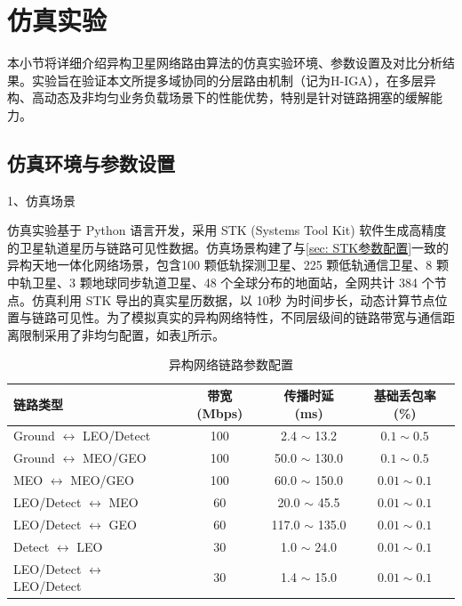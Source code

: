 \section{仿真实验}
    本小节将详细介绍异构卫星网络路由算法的仿真实验环境、参数设置及对比分析结果。实验旨在验证本文所提多域协同的分层路由机制（记为H-IGA），在多层异构、高动态及非均匀业务负载场景下的性能优势，特别是针对链路拥塞的缓解能力。
    \subsection{仿真环境与参数设置}
    1、仿真场景
    
    仿真实验基于 Python 语言开发，采用 STK (Systems Tool Kit) 软件生成高精度的卫星轨道星历与链路可见性数据。仿真场景构建了与\ref{sec: STK参数配置}一致的异构天地一体化网络场景，包含100 颗低轨探测卫星、225 颗低轨通信卫星、8 颗中轨卫星、3 颗地球同步轨道卫星、48 个全球分布的地面站，全网共计 384 个节点。仿真利用 STK 导出的真实星历数据，以 10秒 为时间步长，动态计算节点位置与链路可见性。为了模拟真实的异构网络特性，不同层级间的链路带宽与通信距离限制采用了非均匀配置，如表\ref{tab: 异构网络链路参数配置}所示。
    
    \begin{table}[htbp]
        \caption{异构网络链路参数配置}
        \centering
        \begin{tabular}{lccc}
        \toprule
        \textbf{链路类型} & \textbf{带宽 (Mbps)} & \textbf{传播时延 (ms)} & \textbf{基础丢包率 (\%)} \\
        \midrule
        Ground $\leftrightarrow$ LEO/Detect & 100 & 2.4 $\sim$ 13.2 & $0.1 \sim 0.5$ \\
        Ground $\leftrightarrow$ MEO/GEO & 100 & 50.0 $\sim$ 130.0 & $0.1 \sim 0.5$ \\
        MEO $\leftrightarrow$ MEO/GEO & 100 & 60.0 $\sim$ 150.0 & $0.01 \sim 0.1$ \\
        LEO/Detect $\leftrightarrow$ MEO & 60 & 20.0 $\sim$ 45.5 & $0.01 \sim 0.1$ \\
        LEO/Detect $\leftrightarrow$ GEO & 60 & 117.0 $\sim$ 135.0 & $0.01 \sim 0.1$ \\
        Detect $\leftrightarrow$ LEO & 30 & 1.0 $\sim$ 24.0 & $0.01 \sim 0.1$ \\
        LEO/Detect $\leftrightarrow$ LEO/Detect & 30 & 1.4 $\sim$ 15.0 & $0.01 \sim 0.1$ \\
        \bottomrule
        \end{tabular}
        \label{tab: 异构网络链路参数配置}
    \end{table}


